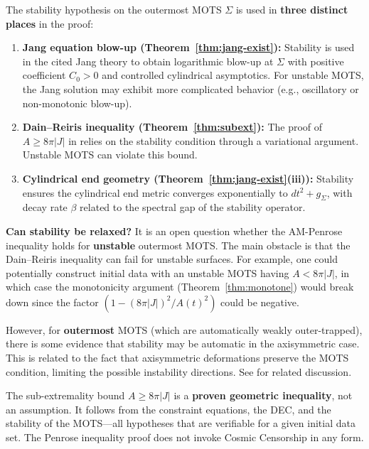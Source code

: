 \begin{remark}\label{rem:stability-necessity}
The stability hypothesis on the outermost MOTS $\Sigma$ is used in \textbf{three distinct places} in the proof:

\begin{enumerate}
    \item \textbf{Jang equation blow-up (Theorem~\ref{thm:jang-exist}):} Stability is used in the cited Jang theory to obtain logarithmic blow-up at $\Sigma$ with positive coefficient $C_0>0$ and controlled cylindrical asymptotics. For unstable MOTS, the Jang solution may exhibit more complicated behavior (e.g., oscillatory or non-monotonic blow-up).
    
    \item \textbf{Dain--Reiris inequality (Theorem~\ref{thm:subext}):} The proof of $A \geq 8\pi|J|$ in \cite{dain2011} relies on the stability condition through a variational argument. Unstable MOTS can violate this bound.
    
    \item \textbf{Cylindrical end geometry (Theorem~\ref{thm:jang-exist}(iii)):} Stability ensures the cylindrical end metric converges exponentially to $dt^2 + g_\Sigma$, with decay rate $\beta$ related to the spectral gap of the stability operator.
\end{enumerate}

\textbf{Can stability be relaxed?} It is an open question whether the AM-Penrose inequality holds for \textbf{unstable} outermost MOTS. The main obstacle is that the Dain--Reiris inequality can fail for unstable surfaces. For example, one could potentially construct initial data with an unstable MOTS having $A < 8\pi|J|$, in which case the monotonicity argument (Theorem~\ref{thm:monotone}) would break down since the factor $(1 - (8\pi|J|)^2/A(t)^2)$ could be negative.

However, for \textbf{outermost} MOTS (which are automatically weakly outer-trapped), there is some evidence that stability may be automatic in the axisymmetric case. This is related to the fact that axisymmetric deformations preserve the MOTS condition, limiting the possible instability directions. See \cite{anderssonmetzger2009} for related discussion.
\end{remark}

\begin{remark}
The sub-extremality bound $A \geq 8\pi|J|$ is a \textbf{proven geometric inequality}, not an assumption. It follows from the constraint equations, the DEC, and the stability of the MOTS---all hypotheses that are verifiable for a given initial data set. The Penrose inequality proof does not invoke Cosmic Censorship in any form.
\end{remark}


